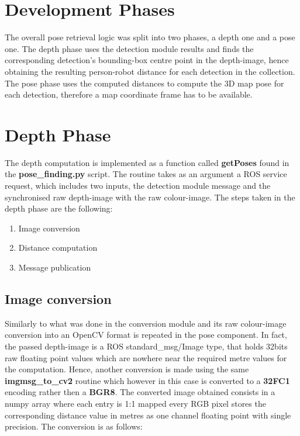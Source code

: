 \section{Development Phases}

The overall pose retrieval logic was split into two phases, a depth one and a pose one. The depth phase uses the detection module results and finds the corresponding detection's bounding-box centre point in the depth-image, hence obtaining the resulting person-robot distance for each detection in the collection. The pose phase uses the computed distances to compute the 3D map pose for each detection, therefore a map coordinate frame has to be available.

\section{Depth Phase}

The depth computation is implemented as a function called \textbf{getPoses} found in the \textbf{pose\_finding.py} script. The routine takes as an argument a ROS service request, which includes two inputs, the detection module message and the synchronised raw depth-image with the raw colour-image. The steps taken in the depth phase are the following:

\begin{enumerate}
  \item Image conversion
  \item Distance computation
  \item Message publication
\end{enumerate}

\subsection{Image conversion}

Similarly to what was done in the conversion module and its raw colour-image conversion into an OpenCV format is repeated in the pose component. In fact, the passed depth-image is a ROS standard\_msg/Image type, that holds 32bits raw floating point values which are nowhere near the required metre values for the computation. Hence, another conversion is made using the same \textbf{imgmsg\_to\_cv2} routine which however in this case is converted to a \textbf{32FC1} encoding rather then a \textbf{BGR8}. The converted image obtained consists in a numpy array where each entry is 1:1 mapped every RGB pixel stores the corresponding distance value in metres as one channel floating point with single precision. The conversion is as follows:

